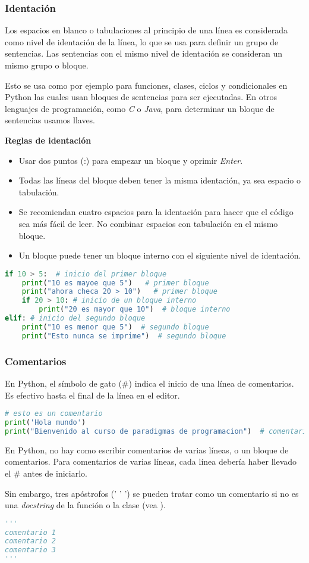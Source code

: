     \subsubsection{Identación}\label{subsubsec: identacion}
    Los espacios en blanco o tabulaciones al principio de una línea es considerada como nivel de identación de la línea, lo que se usa para definir un grupo de sentencias. Las sentencias con el mismo nivel de identación se consideran un mismo grupo o bloque.\par 
    Esto se usa como por ejemplo para funciones, clases, ciclos y condicionales en Python las cuales usan bloques de sentencias para ser ejecutadas. En otros lenguajes de programación, como \emph{C} o \emph{Java}, para determinar un bloque de sentencias usamos llaves.\par 
    \textbf{Reglas de identación}
    \begin{itemize}
        \item Usar dos puntos (:) para empezar un bloque y oprimir \emph{Enter}.
        \item Todas las líneas del bloque deben tener la misma identación, ya sea espacio o tabulación.
        \item Se recomiendan cuatro espacios para la identación para hacer que el código sea más fácil de leer. No combinar espacios con tabulación en el mismo bloque.
        \item Un bloque puede tener un bloque interno con el siguiente nivel de identación.
    \end{itemize}
    \begin{lstlisting}[language={python}]
if 10 > 5:  # inicio del primer bloque
    print("10 es mayoe que 5")   # primer bloque
    print("ahora checa 20 > 10")   # primer bloque
    if 20 > 10: # inicio de un bloque interno
        print("20 es mayor que 10")  # bloque interno
elif: # inicio del segundo bloque
    print("10 es menor que 5")  # segundo bloque
    print("Esto nunca se imprime")  # segundo bloque
    \end{lstlisting}
    \subsubsection{Comentarios}\label{subsubsec: comentarios}
    En Python, el símbolo de gato (\#) indica el inicio de una línea de comentarios.  Es efectivo hasta el final de la línea en el editor.
    \begin{lstlisting}[language={python}]
# esto es un comentario
print('Hola mundo')
print("Bienvenido al curso de paradigmas de programacion")  # comentario al final de la sentencia
    \end{lstlisting}
    En Python, no hay como escribir comentarios de varias líneas, o un bloque de comentarios. Para comentarios de varias líneas, cada línea debería haber llevado el \# antes de iniciarlo.\par 
    Sin embargo, tres apóstrofos (' ' ') se pueden tratar como un comentario si no es una \emph{docstring} de la función o la clase (vea ).
    \begin{lstlisting}[language={python}]
'''
comentario 1
comentario 2
comentario 3
'''
    \end{lstlisting}
